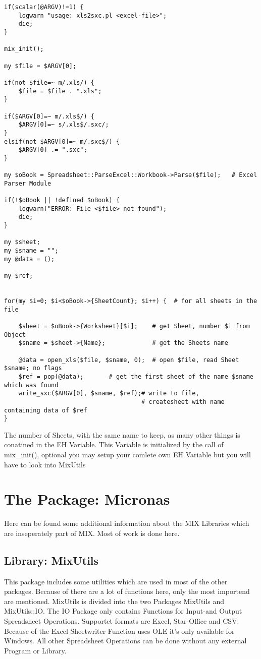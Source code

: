 \documentclass[a4paper,12pt]{article}
\begin{document}
\begin{verbatim}
if(scalar(@ARGV)!=1) {
    logwarn "usage: xls2sxc.pl <excel-file>";
    die;
}

mix_init();

my $file = $ARGV[0];

if(not $file=~ m/.xls/) {
    $file = $file . ".xls";
}

if($ARGV[0]=~ m/.xls$/) {
    $ARGV[0]=~ s/.xls$/.sxc/;
} 
elsif(not $ARGV[0]=~ m/.sxc$/) { 
    $ARGV[0] .= ".sxc";
}

my $oBook = Spreadsheet::ParseExcel::Workbook->Parse($file);   # Excel Parser Module

if(!$oBook || !defined $oBook) {
    logwarn("ERROR: File <$file> not found");
    die;
}

my $sheet;
my $sname = "";
my @data = ();

my $ref;


for(my $i=0; $i<$oBook->{SheetCount}; $i++) {  # for all sheets in the file

    $sheet = $oBook->{Worksheet}[$i];    # get Sheet, number $i from Object
    $sname = $sheet->{Name};             # get the Sheets name

    @data = open_xls($file, $sname, 0);  # open $file, read Sheet $sname; no flags
    $ref = pop(@data);       # get the first sheet of the name $sname which was found
    write_sxc($ARGV[0], $sname, $ref);# write to file,
                                      # createsheet with name containing data of $ref 
}

\end{verbatim}
The number of Sheets, with the same name to keep, as many other things is conatined in the EH Variable. This Variable is initialized by the call of mix\_init(), optional you may setup your comlete own EH Variable but you will have to look into MixUtils%

\section{The Package: Micronas}
Here can be found some additional information about the MIX Libraries which are inseperately part of MIX. Most of work is done here.

\subsection{Library: MixUtils}
This package includes some utilities which are used in most of the other packages. Because of there are a lot of functions here, only the most importend are mentioned. MixUtils is divided into the two Packages MixUtils and MixUtils::IO. The IO Package only contains Functions for Input-and Output Spreadsheet Operations. Supportet formats are Excel, Star-Office and CSV. Because of the Excel-Sheetwriter Function uses OLE it's only available for Windows. All other Spreadsheet Operations can be done without any external Program or Library.
\end{document}
